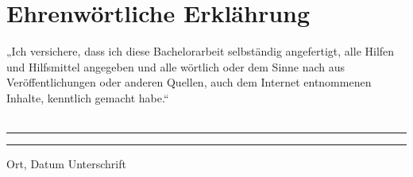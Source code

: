 \section{Ehrenwörtliche Erklährung}
„Ich versichere, dass ich diese Bachelorarbeit selbständig angefertigt, alle Hilfen und Hilfsmittel angegeben und alle wörtlich oder dem Sinne nach aus Veröffentlichungen oder anderen Quellen, auch dem Internet entnommenen Inhalte, kenntlich gemacht habe.“
\\$~~$\\
\\$~~$\\
\vspace{50pt}
\noindent\rule{5cm}{.4pt}\hfill\rule{5cm}{.4pt}\par
\noindent Ort, Datum \hfill Unterschrift
